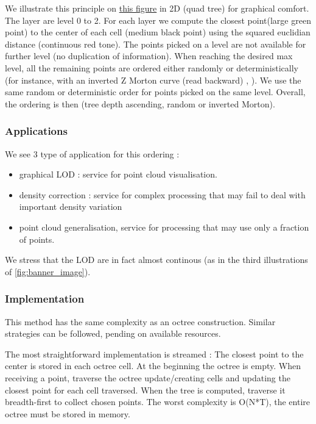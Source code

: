 			 We illustrate this principle on 
			\href{fig:midoc-principle}{this figure} in 2D (quad tree) for graphical comfort. The layer are level 0 to 2. For each layer we compute the closest point(large green point) to the center of each cell (medium black point) using the squared euclidian distance (continuous red tone). The points picked on a level are not available for further level (no duplication of information).
			When reaching the desired max level, all the remaining points are ordered either randomly or deterministically (for instance, with an inverted Z Morton curve (read backward) , ).
			We use the same random or deterministic order for points picked on the same level.
			Overall, the ordering is then (tree depth ascending, random or inverted Morton).
		
		\subsubsection{Applications}
			We see 3 type of application for this ordering :
			\begin{itemize}
				\item graphical LOD : service for point cloud visualisation.
				\item density correction : service for complex processing that may fail to deal with important density variation
				\item point cloud generalisation, service for processing that may use only a fraction of points.
			\end{itemize}	
			
			We stress that the LOD are in fact almost continous (as in the third illustrations of \ref{fig:banner_image}).
					
					
		\subsubsection{Implementation}
			
			This method has the same complexity as an octree construction. Similar strategies can be followed, pending on available resources.
			
			 
			The most straightforward implementation is streamed :
			The closest point to the center is stored in each octree cell.
			At the beginning the octree is empty. When receiving a point, traverse the octree update/creating cells and updating the closest point for each cell traversed.
			When the tree is computed, traverse it breadth-first to collect chosen points.
			The worst complexity is O(N*T), the entire octree must be stored in memory.
			
